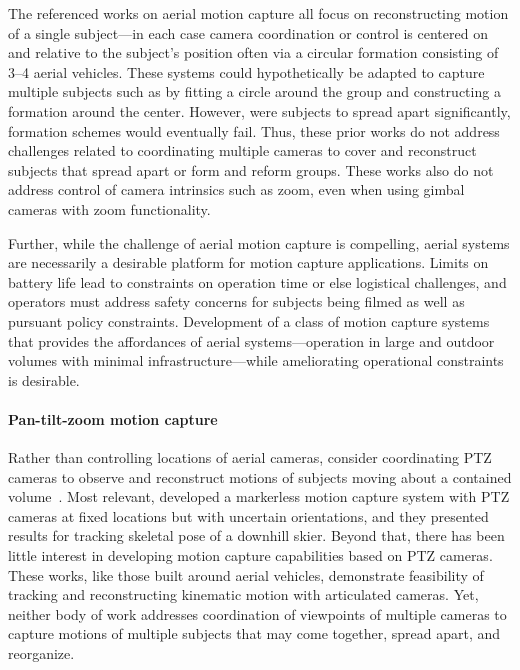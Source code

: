 \documentclass[11pt]{article}
\begin{document}
The referenced works on aerial motion capture all focus on reconstructing motion
of a single subject---in each case camera coordination or control is centered
on and relative to the subject's position often via a circular formation
consisting of 3--4 aerial vehicles.
These systems could hypothetically be adapted to capture multiple subjects such
as by fitting a circle around the group and constructing a formation around the
center.
However, were subjects to spread apart significantly, formation schemes would
eventually fail.
Thus, these prior works do not address challenges related to
coordinating multiple cameras to cover and reconstruct subjects that spread
apart or form and reform groups.
These works also do not address control of camera intrinsics such as zoom, even
when using gimbal cameras with zoom functionality.

Further, while the challenge of aerial motion capture is compelling,
aerial systems are necessarily a desirable platform for motion capture
applications.
Limits on battery life lead to constraints on operation time or else
logistical challenges, and
operators must address safety concerns for subjects being filmed as well as
pursuant policy constraints.
Development of a class of motion capture systems that
provides the affordances of aerial systems---operation in large and outdoor volumes with
minimal infrastructure---while ameliorating operational constraints is
desirable.

\paragraph{Pan-tilt-zoom motion capture}
Rather than controlling locations of aerial cameras, consider coordinating
PTZ cameras to observe and reconstruct
motions of subjects moving about a contained
volume~\citep{bachmann20193dv,yamamoto2022visigrapp}.
Most relevant, \citet{bachmann20193dv} developed a
markerless motion capture system with PTZ cameras at fixed
locations but with uncertain orientations, and they presented
results for tracking skeletal pose of a downhill skier.
Beyond that, there has been little interest in developing
motion capture capabilities based on PTZ cameras.
These works, like those built around aerial
vehicles, demonstrate feasibility of
tracking and reconstructing kinematic motion with articulated cameras.
Yet, neither body of work addresses coordination of
viewpoints of multiple cameras to capture motions of multiple subjects
that may come together, spread apart, and reorganize.
\end{document}
